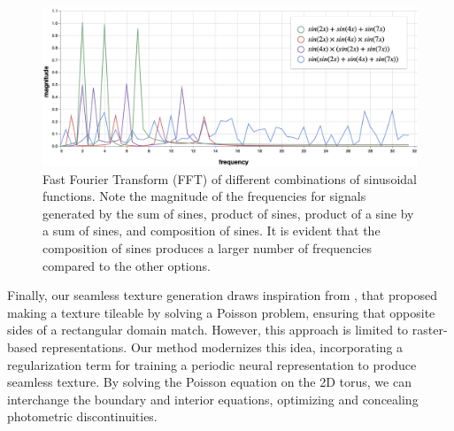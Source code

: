 \begin{figure}[h]
\centering
\includegraphics[width=0.80\linewidth]{img/ch6/generated_frequencies.png}
\caption{Fast Fourier Transform (FFT) of different combinations of sinusoidal functions. Note the magnitude of the frequencies for signals generated by the sum of sines, product of sines, product of a sine by a sum of sines, and composition of sines. It is evident that the composition of sines produces a larger number of frequencies compared to the other options.}
\label{f:generated-frequencies}
\end{figure}
    

Finally, our seamless texture generation draws inspiration from \citet{perez2003}, that proposed making a texture tileable by solving a Poisson problem, ensuring that opposite sides of a rectangular domain match. However, this approach is limited to raster-based representations. Our method modernizes this idea, incorporating a regularization term for training a periodic neural representation to produce seamless texture. By solving the Poisson equation on the 2D torus, we can interchange the boundary and interior equations, optimizing and concealing photometric discontinuities.


